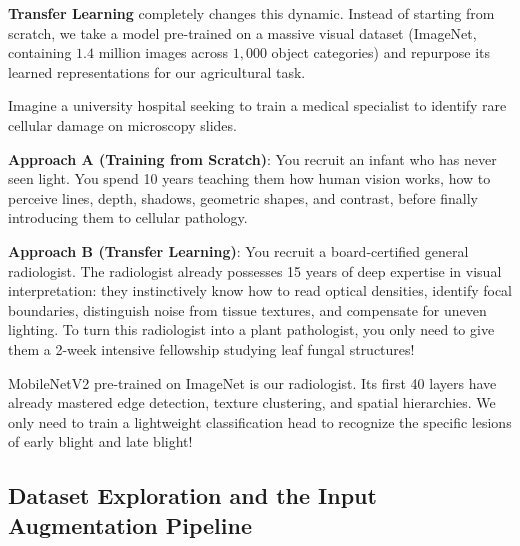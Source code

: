 \textbf{Transfer Learning} completely changes this dynamic. Instead of starting from scratch, we take a model pre-trained on a massive visual dataset (ImageNet, containing $1.4$ million images across $1{,}000$ object categories) and repurpose its learned representations for our agricultural task.

\begin{analogy}
Imagine a university hospital seeking to train a medical specialist to identify rare cellular damage on microscopy slides.

\textbf{Approach A (Training from Scratch)}: You recruit an infant who has never seen light. You spend 10 years teaching them how human vision works, how to perceive lines, depth, shadows, geometric shapes, and contrast, before finally introducing them to cellular pathology.

\textbf{Approach B (Transfer Learning)}: You recruit a board-certified general radiologist. The radiologist already possesses 15 years of deep expertise in visual interpretation: they instinctively know how to read optical densities, identify focal boundaries, distinguish noise from tissue textures, and compensate for uneven lighting. To turn this radiologist into a plant pathologist, you only need to give them a 2-week intensive fellowship studying leaf fungal structures!

MobileNetV2 pre-trained on ImageNet is our radiologist. Its first 40 layers have already mastered edge detection, texture clustering, and spatial hierarchies. We only need to train a lightweight classification head to recognize the specific lesions of early blight and late blight!
\end{analogy}

\subsection{Dataset Exploration and the Input Augmentation Pipeline}\label{subsec:p2_data}

